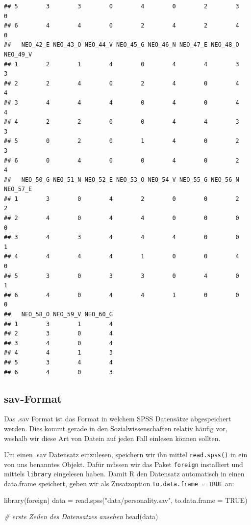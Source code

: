 \documentclass[
]{book}
\newenvironment{Shaded}{\begin{snugshade}}{\end{snugshade}}
\newcommand{\AttributeTok}[1]{\textcolor[rgb]{0.77,0.63,0.00}{#1}}
\newcommand{\CommentTok}[1]{\textcolor[rgb]{0.56,0.35,0.01}{\textit{#1}}}
\newcommand{\ConstantTok}[1]{\textcolor[rgb]{0.00,0.00,0.00}{#1}}
\newcommand{\FunctionTok}[1]{\textcolor[rgb]{0.00,0.00,0.00}{#1}}
\newcommand{\NormalTok}[1]{#1}
\newcommand{\OtherTok}[1]{\textcolor[rgb]{0.56,0.35,0.01}{#1}}
\newcommand{\StringTok}[1]{\textcolor[rgb]{0.31,0.60,0.02}{#1}}
\begin{document}
\begin{verbatim}
## 5        3        3        0        4        0        2        3        0
## 6        4        4        0        2        4        2        4        0
##   NEO_42_E NEO_43_O NEO_44_V NEO_45_G NEO_46_N NEO_47_E NEO_48_O NEO_49_V
## 1        2        1        4        0        4        4        3        3
## 2        2        4        0        2        4        0        4        4
## 3        4        4        4        0        4        0        4        4
## 4        2        2        0        0        4        4        3        3
## 5        0        2        0        1        4        0        2        3
## 6        0        4        0        0        4        0        2        4
##   NEO_50_G NEO_51_N NEO_52_E NEO_53_O NEO_54_V NEO_55_G NEO_56_N NEO_57_E
## 1        3        0        4        2        0        0        2        2
## 2        4        0        4        4        0        0        0        0
## 3        4        3        4        4        4        0        0        1
## 4        4        4        4        1        0        0        4        0
## 5        3        0        3        3        0        4        0        1
## 6        4        0        4        4        1        0        0        0
##   NEO_58_O NEO_59_V NEO_60_G
## 1        3        1        4
## 2        3        0        4
## 3        4        0        4
## 4        4        1        3
## 5        3        4        4
## 6        4        0        3
\end{verbatim}

\hypertarget{sav-format}{%
\subsection{sav-Format}\label{sav-format}}

Das .sav Format ist das Format in welchem SPSS Datensätze abgespeichert werden. Dies kommt gerade in den Sozialwissenschaften relativ häufig vor, weshalb wir diese Art von Datein auf jeden Fall einlesen können sollten.

Um einen .sav Datensatz einzulesen, speichern wir ihn mittel \texttt{read.spss()} in ein von uns benanntes Objekt. Dafür müssen wir das Paket \texttt{foreign} installiert und mittels \texttt{library} eingelesen haben. Damit R den Datensatz automatisch in einen data.frame speichert, geben wir als Zusatzoption \texttt{to.data.frame\ =\ TRUE} an:

\begin{Shaded}
\begin{Highlighting}[]
\FunctionTok{library}\NormalTok{(foreign)}
\NormalTok{data }\OtherTok{=} \FunctionTok{read.spss}\NormalTok{(}\StringTok{"data/personality.sav"}\NormalTok{, }\AttributeTok{to.data.frame =} \ConstantTok{TRUE}\NormalTok{)}

\CommentTok{\# erste Zeilen des Datensatzes ansehen}
\FunctionTok{head}\NormalTok{(data)}
\end{Highlighting}
\end{Shaded}
\end{document}
